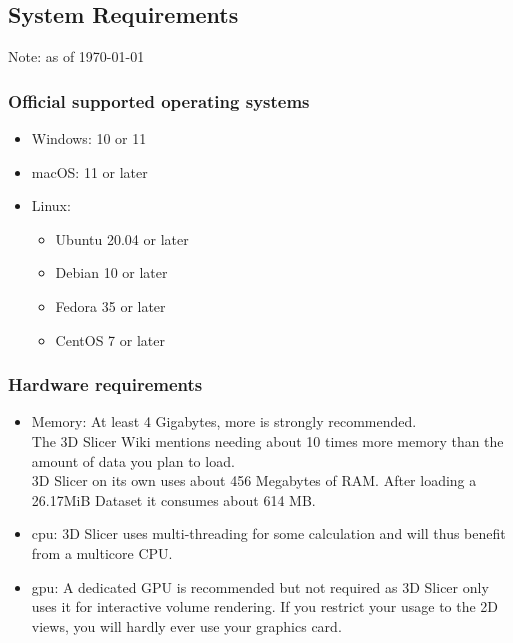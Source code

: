 \subsection{System Requirements\cite{fedorov3DSlicerImage2012}}
Note: as of \today
\subsubsection{Official supported operating systems}
\begin{itemize}
	\item Windows: 10 or 11
	\item macOS: 11 or later
	\item Linux:
	      \begin{itemize}
		      \item Ubuntu 20.04 or later
		      \item Debian 10 or later
		      \item Fedora 35 or later
		      \item CentOS 7 or later
	      \end{itemize}
\end{itemize}

\subsubsection{Hardware requirements}
\begin{itemize}
	\item Memory: At least 4 Gigabytes, more is strongly recommended.\\The 3D Slicer Wiki mentions needing about 10 times more memory than the amount of data you plan to load.\\ 3D Slicer on its own uses about 456 Megabytes of RAM. After loading a 26.17MiB Dataset it consumes about 614 MB.
	\item \gls{cpu}: 3D Slicer uses multi-threading for some calculation and will thus benefit from a multicore CPU.
	\item \gls{gpu}: A dedicated GPU is recommended but not required as 3D Slicer only uses it for interactive volume rendering. If you restrict your usage to the 2D views, you will hardly ever use your graphics card.
\end{itemize}

